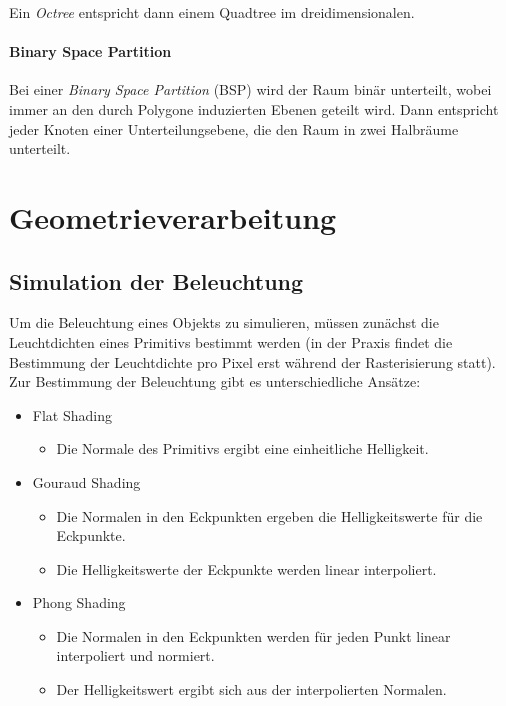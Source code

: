 					Ein \emph{Octree} entspricht dann einem Quadtree im dreidimensionalen.

				\paragraph{Binary Space Partition}
					Bei einer \emph{Binary Space Partition} (BSP) wird der Raum binär unterteilt, wobei immer an den durch Polygone induzierten Ebenen geteilt wird. Dann entspricht jeder Knoten einer Unterteilungsebene, die den Raum in zwei Halbräume unterteilt.

	\section{Geometrieverarbeitung}
		\subsection{Simulation der Beleuchtung}
			Um die Beleuchtung eines Objekts zu simulieren, müssen zunächst die Leuchtdichten eines Primitivs bestimmt werden (in der Praxis findet die Bestimmung der Leuchtdichte pro Pixel erst während der Rasterisierung statt). Zur Bestimmung der Beleuchtung gibt es unterschiedliche Ansätze:
			\begin{itemize}
				\item Flat Shading
					\begin{itemize}
						\item Die Normale des Primitivs ergibt eine einheitliche Helligkeit.
					\end{itemize}
				\item Gouraud Shading
					\begin{itemize}
						\item Die Normalen in den Eckpunkten ergeben die Helligkeitswerte für die Eckpunkte.
						\item Die Helligkeitswerte der Eckpunkte werden linear interpoliert.
					\end{itemize}
				\item Phong Shading
					\begin{itemize}
						\item Die Normalen in den Eckpunkten werden für jeden Punkt linear interpoliert und normiert.
						\item Der Helligkeitswert ergibt sich aus der interpolierten Normalen.
					\end{itemize}
			\end{itemize}

